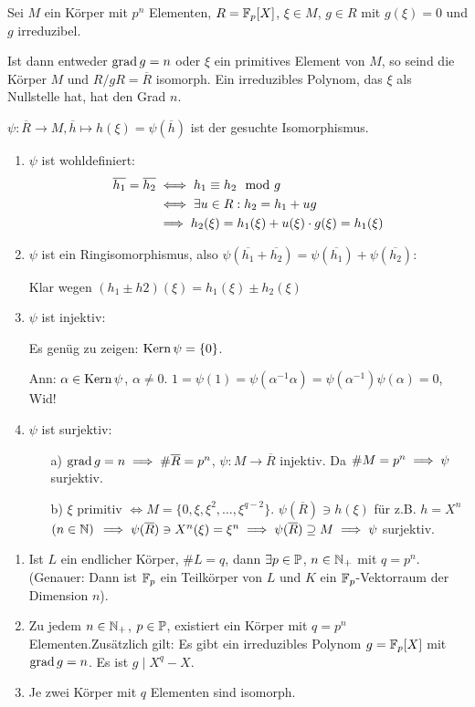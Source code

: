 \documentclass[a4paper,twoside,DIV15,BCOR12mm]{scrbook}
\begin{document}
\begin{hilfssatz}[5]
Sei $M$ ein Körper mit $p^n$ Elementen, $R=\mathbb{F}_p[X]$, $\xi\in M$, $g\in R$ mit $g(\xi)=0$ und $g$ irreduzibel.

Ist dann entweder $\mathop{\mathrm{grad}}\nolimits g= n$ oder $\xi$ ein primitives Element von $M$, so seind die Körper $M$ und $R/gR = \overline R$ isomorph. Ein irreduzibles Polynom, das $\xi$ als Nullstelle hat, hat den Grad $n$.
\end{hilfssatz}
\begin{beweis}
$\psi:\overline R \to M, \overline h \mapsto h(\xi)=\psi(\overline h)$ ist der gesuchte Isomorphismus.
\begin{enumerate}
\item $\psi$ ist wohldefiniert:
\begin{align*}
\overline{h_1} = \overline{h_2} &\iff h_1 \equiv h_2 \mod g \\
&\iff \exists u\in R: h_2 = h_1 + ug\\
&\implies h_2(\xi) = h_1(\xi) + u(\xi)\cdot g(\xi) = h_1(\xi)
\end{align*}
\item $\psi$ ist ein Ringisomorphismus, also $\psi(\overline {h_1} + \overline{h_2}) = \psi(\overline{h_1}) + \psi(\overline{h_2})$:

Klar wegen $(h_1 \pm h2)(\xi) = h_1(\xi) \pm h_2(\xi)$
\item $\psi$ ist injektiv:

Es genüg zu zeigen: $\mathop{\mathrm{Kern}}\nolimits \psi = \{0\}$.

Ann: $\alpha \in \mathop{\mathrm{Kern}}\nolimits \psi$, $\alpha \ne 0$. $1 = \psi(1) = \psi(\alpha^{-1} \alpha) = \psi(\alpha^{-1})\psi(\alpha) = 0$, Wid!
\item $\psi$ ist surjektiv:
\begin{enumerate}
\item[a)] $\mathop{\mathrm{grad}}\nolimits g = n \implies \#\overline R = p^n$, $\psi:M\to\overline R$ injektiv. Da $\#M = p^n \implies \psi$ surjektiv.
\item[b)] $\xi$ primitiv $\iff M=\{0,\xi,\xi^2,\ldots,\xi^{q-2}\}$. $\psi(\overline R) \ni h(\xi)$ für z.B. $h=X^n$ $(n\in\mathbb{N})$ $\implies \psi(\overline R) \ni X^n(\xi) = \xi ^n \implies \psi(\overline R) \supseteq M \implies \psi$ surjektiv.
\end{enumerate}
\end{enumerate}
\end{beweis}

\begin{satz}
\begin{enumerate}
\item Ist $L$ ein endlicher Körper, $\#L=q$, dann $\exists p \in \mathbb{P}$, $n\in\mathbb{N}_+$ mit $q=p^n$. (Genauer: Dann ist $\mathbb{F}_p$ ein Teilkörper von $L$ und $K$ ein $\mathbb{F}_p$-Vektorraum der Dimension $n$).
\item Zu jedem $n\in\mathbb{N}_+$, $p\in\mathbb{P}$, existiert ein Körper mit $q=p^n$ Elementen.Zusätzlich gilt: Es gibt ein irreduzibles Polynom $g=\mathbb{F}_p[X]$ mit $\mathop{\mathrm{grad}}\nolimits g=n$. Es ist $g \mid X^q -X$.
\item Je zwei Körper mit $q$ Elementen sind isomorph.
\end{enumerate}
\end{satz}
\end{document}
